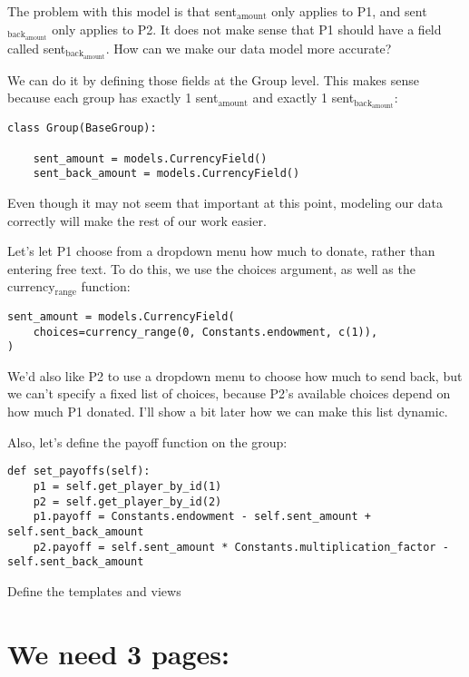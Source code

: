 \documentclass[11pt]{article}
\begin{document}
The problem with this model is that sent\(_{\text{amount}}\) only applies to P1, and sent\(_{\text{back}}_{\text{amount}}\) only applies to P2. It does not make sense that P1 should have a field called sent\(_{\text{back}}_{\text{amount}}\). How can we make our data model more accurate?

We can do it by defining those fields at the Group level. This makes sense because each group has exactly 1 sent\(_{\text{amount}}\) and exactly 1 sent\(_{\text{back}}_{\text{amount}}\):

\begin{verbatim}
class Group(BaseGroup):

    sent_amount = models.CurrencyField()
    sent_back_amount = models.CurrencyField()
\end{verbatim}

Even though it may not seem that important at this point, modeling our data correctly will make the rest of our work easier.

Let’s let P1 choose from a dropdown menu how much to donate, rather than entering free text. To do this, we use the choices argument, as well as the currency\(_{\text{range}}\) function:

\begin{verbatim}
sent_amount = models.CurrencyField(
    choices=currency_range(0, Constants.endowment, c(1)),
)
\end{verbatim}

We’d also like P2 to use a dropdown menu to choose how much to send back, but we can’t specify a fixed list of choices, because P2’s available choices depend on how much P1 donated. I’ll show a bit later how we can make this list dynamic.

Also, let’s define the payoff function on the group:

\begin{verbatim}
def set_payoffs(self):
    p1 = self.get_player_by_id(1)
    p2 = self.get_player_by_id(2)
    p1.payoff = Constants.endowment - self.sent_amount + self.sent_back_amount
    p2.payoff = self.sent_amount * Constants.multiplication_factor - self.sent_back_amount
\end{verbatim}

Define the templates and views

\section{We need 3 pages:}
\label{sec:orgheadline4}
\end{document}
